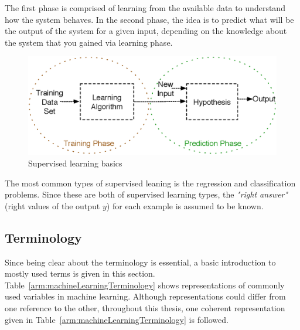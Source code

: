 The first phase is comprised of learning from the available data to understand how the system behaves. 
In the second phase, the idea is to predict what will be the output of the system for a given input, depending on the knowledge about the system that you gained via learning phase. 

\begin{figure}
\begin{center}
\includegraphics[width=14cm]{figures/supervisedLearningBasics}    %
\caption{Supervised learning basics } 
\label{fig:supervisedLearningBasics}
\end{center}
\end{figure}
 
The most common types of supervised leaning is the regression and classification problems. 
Since these are both of supervised learning types, the \textit{"right answer"} (right values of the output $y$) for each example is assumed to be known. 

\subsection{Terminology}

Since being clear about the terminology is essential, a basic introduction to mostly used terms is given in this section.  
Table~\ref{arm:machineLearningTerminology} shows representations of commonly used variables in machine learning. 
Although representations could differ from one reference to the other, throughout this thesis, one coherent representation given in Table~\ref{arm:machineLearningTerminology} is followed. 

